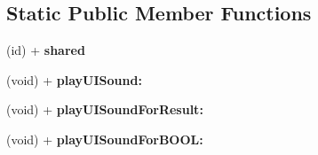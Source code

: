 \subsection*{Static Public Member Functions}
\begin{DoxyCompactItemize}
\item 
\hypertarget{interface_app_controller_afdf84561ed1b66e3f1de345f67321e77}{
(id) + {\bfseries shared}}
\label{interface_app_controller_afdf84561ed1b66e3f1de345f67321e77}

\item 
\hypertarget{interface_app_controller_abd43b4b6cd3dbfb52e26047cb29b9d8d}{
(void) + {\bfseries playUISound:}}
\label{interface_app_controller_abd43b4b6cd3dbfb52e26047cb29b9d8d}

\item 
\hypertarget{interface_app_controller_aa365c48526ba5be74e12adbae9007589}{
(void) + {\bfseries playUISoundForResult:}}
\label{interface_app_controller_aa365c48526ba5be74e12adbae9007589}

\item 
\hypertarget{interface_app_controller_aa8aafd798f4a727c33aff3ca8c02e2f4}{
(void) + {\bfseries playUISoundForBOOL:}}
\label{interface_app_controller_aa8aafd798f4a727c33aff3ca8c02e2f4}

\end{DoxyCompactItemize}
